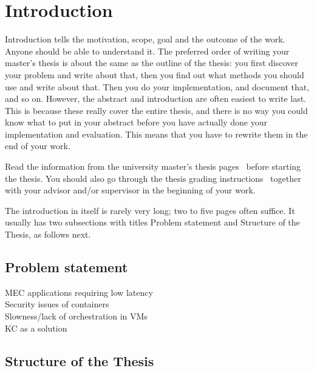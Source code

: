 \chapter{Introduction}
\label{chapter:intro}

Introduction tells the motivation, scope, goal and the outcome of the
work. Anyone should be able to understand it. The preferred order of
writing your master's thesis is about the same as the outline of the
thesis: you first discover your problem and write about that, then you
find out what methods you should use and write about that.  Then you
do your implementation, and document that, and so on.  However, the
abstract and introduction are often easiest to write last.  This is
because these really cover the entire thesis, and there is no way you
could know what to put in your abstract before you have actually done
your implementation and evaluation. This means that you have to
rewrite them in the end of your work.

Read the information from the university master's thesis
pages~\cite{ThesisInstructions} before starting the thesis.  You
should also go through the thesis grading
instructions~\cite{ThesisGrading} together with your advisor and/or
supervisor in the beginning of your work.

The introduction in itself is rarely very long; two to five pages
often suffice. It usually has two subsections with titles Problem
statement and Structure of the Thesis, as follows next.

\section{Problem statement}
\label{section:problem} 

MEC applications requiring low latency \\
Security issues of containers \\
Slowness/lack of orchestration in VMs \\
KC as a solution \\


\section{Structure of the Thesis}
\label{section:structure} 



